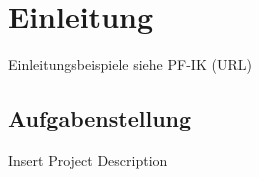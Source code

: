 \section{Einleitung}

\lipsum[3-4]

Einleitungsbeispiele siehe PF-IK (URL)

\subsection{Aufgabenstellung}\label{sec:projectdescription}

Insert Project Description
